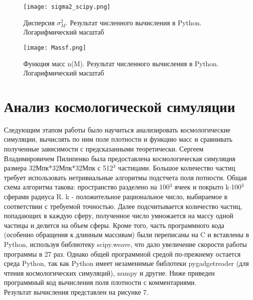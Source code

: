 \documentclass[11pt]{article}
\begin{document}
\begin{figure}[H]
\centering
\texttt{[image: sigma2\_scipy.png]}
\caption{Дисперсия $\sigma_{M}^{2}$. Результат численного вычисления в Python. Логарифмический масштаб}  
\end{figure}

\begin{figure}[H]
\centering
\texttt{[image: Massf.png]}
\caption{Функция масс n(M). Результат численного вычисления в Python. Логарифмический масштаб}  
\end{figure}

\section{Анализ космологической симуляции}
Следующим этапом работы было научиться анализировать космологические симуляции, вычислять по ним поле плотности и функцию масс и сравнивать полученные зависимости с предсказанными теоретически. Сергеем Владимировичем Пилипенко была предоставлена космологическая симуляция размера 32Мпк*32Мпк*32Мпк с 512$^3$ частицами. Большое количество частиц требует использовать нетривиальные алгоритмы подстчета поля потности. Общая схема алгоритма такова: пространство разделено на 100$^3$ ячеек и покрыто k$\cdot$100$^3$ сферами радиуса R. k - положительное рациональное число, выбираемое в соответствии с требуемой точностью. Далее подсчитывается количество частиц, попадающих в каждую сферу, полученное число умножается на массу одной частицы и делится на объем сферы. Кроме того, часть программного кода (особенно обращения к длинным массивам) были переписаны на C и вставлены в Python, используя библиотеку scipy.weave, что дало увеличение скорости работы программы в 27 раз. Однако общей программной средой по-прежнему остается среда Python, так как Python имеет незаменимые библотеки pygadgetreader (для чтения космологических симуляций), numpy и другие. Ниже приведен программный код вычисления поля плотности с комментариями.
\\
Результат вычисления представлен на рисунке 7.
\lstset{language=Python}
\end{document}
